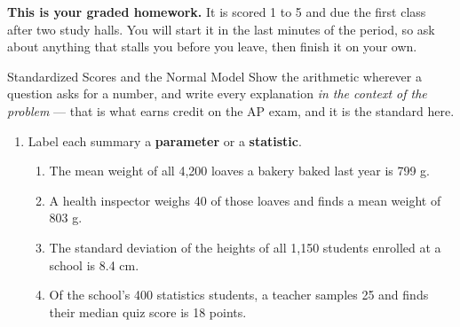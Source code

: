 \boxguard[8]
\begin{remindbox}
\small
\textbf{This is your graded homework.} It is scored 1 to 5 and due the first class after two study
halls. You will start it in the
last minutes of the period, so ask about anything that stalls you before you leave, then finish
it on your own.
\end{remindbox}

\vspace{0.12in}

\boxguard[14]
\begin{notesbox}{Standardized Scores and the Normal Model}
Show the arithmetic wherever a question asks for a number, and write every explanation
\emph{in the context of the problem} --- that is what earns credit on the AP exam, and it is the
standard here.
\begin{enumerate}[leftmargin=1.9em, itemsep=6pt]
  \item Label each summary a \textbf{parameter} or a \textbf{statistic}.
        \begin{enumerate}[label=\textbf{(\roman*)}, leftmargin=2.3em, itemsep=4pt]
          \item The mean weight of all 4,200 loaves a bakery baked last year is 799 g.
                \smash{\gradedblank[id=hw1a, type=short, points=1, answer=parameter, check=text]{3.0cm}{0.2in}}
          \item A health inspector weighs 40 of those loaves and finds a mean weight of 803 g.
                \smash{\gradedblank[id=hw1b, type=short, points=1, answer=statistic, check=text]{3.0cm}{0.2in}}
          \item The standard deviation of the heights of all 1,150 students enrolled at a school
                is 8.4 cm. \smash{\gradedblank[id=hw1c, type=short, points=1, answer=parameter, check=text]{3.0cm}{0.2in}}
          \item Of the school's 400 statistics students, a teacher samples 25 and finds their
                median quiz score is 18 points. \smash{\gradedblank[id=hw1d, type=short, points=1, answer=statistic, check=text]{3.0cm}{0.2in}}
        \end{enumerate}


\end{enumerate}
\end{notesbox}
